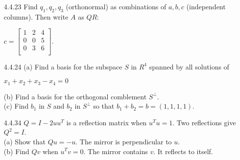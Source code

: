 \documentclass[10pt,twoside,reqno]{article}
\begin{document}
\begin{enumerate}
\vspace{3mm}
\item[4.4.23] Find $q_1, q_2, q_3$ (orthonormal) as combinations of $a, b, c$ (independent columns). Then write $A$ as $QR$:\\
\begin{center}
$
$$
c =
\begin{bmatrix}
1&2&4\\
0&0&5\\
0&3&6\\
\end{bmatrix}
$$
$.\\
\end{center}
\vspace{3mm}

\vspace{3mm}
\item[4.4.24] (a) Find a basis for the subspace $S$ in $R^4$ spanned by all solutions of\\
\begin{center}
$x_1 + x_2 + x_3 - x_4 = 0$\\
\end{center}
(b) Find a basis for the orthogonal comblement $S^{\perp}$.\\
(c) Find $b_1$ in $S$ and $b_2$ in $S^{\perp}$ so that $b_1 + b_2 = b = (1, 1, 1, 1)$.\\
\vspace{3mm}

\vspace{3mm}
\item[4.4.34] $Q = I - 2uu^T$ is a reflection matrix when $u^Tu = 1$. Two reflections give $Q^2 = I$.\\
(a) Show that $Qu = -u$. The mirror is perpendicular to $u$.\\
(b) Find $Qv$ when $u^Tv = 0$. The mirror contains $v$. It reflects to itself.\\
\vspace{3mm}

\vspace{3mm}
\end{enumerate}
\end{document}
